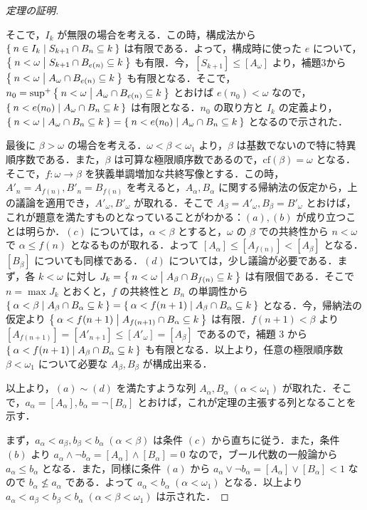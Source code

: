 \documentclass[a4j]{jsarticle}
\newcommand{\cf}{\mathrm{cf}}
\begin{document}
\begin{proof}[定理の証明]
\begin{enumerate}[(a)]
	そこで，$I_k$ が無限の場合を考える．この時，構成法から $\Set{n \in I_k | S_{k+1} \cap B_n \subseteq k}$ は有限である．よって，構成時に使った $e$ について，$\Set{n < \omega | S_{k+1} \cap B_{e(n)} \subseteq k}$ も有限．今，$[S_{k+1}] \leq [A_\omega]$ より，補題3から $\Set{n < \omega | A_\omega \cap B_{e(n)} \subseteq k}$ も有限となる．そこで，$n_0 = \sup^+ \Set{n < \omega | A_\omega \cap B_{e(n)} \subseteq k}$ とおけば $e(n_0) < \omega$ なので，$\Set{ n < e(n_0) | A_\omega \cap B_n \subseteq k}$ は有限となる．$n_0$ の取り方と $I_k$ の定義より，$\Set{n < \omega | A_\omega \cap B_n \subseteq k} = \Set{n < e(n_0) | A_\omega \cap B_n \subseteq k}$ となるので示された．
 \end{enumerate}

 最後に $\beta > \omega$ の場合を考える．$\omega < \beta < \omega_1$ より，$\beta$ は基数でないので特に特異順序数である．また，$\beta$ は可算な極限順序数であるので，$\cf(\beta) = \omega$ となる．そこで，$f: \omega \rightarrow \beta$ を狭義単調増加な共終写像とする．この時，$A'_n = A_{f(n)}, B'_n = B_{f(n)}$ を考えると，$A_\alpha, B_\alpha$ に関する帰納法の仮定から，上の議論を適用でき，$A'_\omega, B'_\omega$ が取れる．そこで $A_\beta = A'_\omega, B_\beta = B'_\omega$ とおけば，これが題意を満たすものとなっていることがわかる：$(a), (b)$ が成り立つことは明らか．$(c)$ については，$\alpha < \beta$ とすると，$\omega$ の $\beta$ での共終性から $n < \omega$ で $\alpha \leq f(n)$ となるものが取れる．よって $[A_\alpha] \leq [A_{f(n)}] < [A_\beta]$ となる．$[B_\beta]$ についても同様である．$(d)$ については，少し議論が必要である．まず，各 $k < \omega$ に対し $J_k = \Set{n < \omega | A_\beta \cap B_{f(n)} \subseteq k}$ は有限個である．そこで $n = \max J_k$ とおくと，$f$ の共終性と $B_n$ の単調性から $\Set{\alpha < \beta | A_\beta \cap B_\alpha \subseteq k} = \Set{ \alpha < f(n+1) | A_\beta \cap B_\alpha \subseteq k}$ となる．今，帰納法の仮定より $\Set{\alpha < f(n+1) | A_{f(n+1)} \cap B_\alpha \subseteq k}$ は有限．$f(n+1) < \beta$ より $[A_{f(n+1)}] = [A'_{n+1}] \leq [A'_\omega] = [A_\beta]$ であるので，補題 $3$ から $\Set{\alpha < f(n+1) | A_\beta \cap B_\alpha \subseteq k}$ も有限となる．以上より，任意の極限順序数 $\beta < \omega_1$ について必要な $A_\beta, B_\beta$ が構成出来る．

 以上より，$(a) \sim (d)$ を満たすような列 $A_\alpha, B_\alpha \; (\alpha < \omega_1)$ が取れた．そこで，$a_\alpha = [A_\alpha], b_\alpha = \neg [B_\alpha]$ とおけば，これが定理の主張する列となることを示す．

 まず，$a_\alpha < a_\beta, b_\beta < b_\alpha \; (\alpha < \beta)$ は条件 $(c)$ から直ちに従う．また，条件 $(b)$ より $a_\alpha \wedge \neg b_\alpha = [A_\alpha] \wedge [B_\alpha] = 0$ なので，ブール代数の一般論から $a_\alpha \leq b_\alpha$ となる．また，同様に条件 $(a)$ から $a_\alpha \vee \neg b_\alpha = [A_\alpha] \vee [B_\alpha] < 1$ なので $b_\alpha \not\leq a_\alpha$ である．よって $a_\alpha < b_\alpha \; (\alpha < \omega_1)$ となる．以上より $a_\alpha < a_\beta < b_\beta < b_\alpha \; (\alpha < \beta < \omega_1)$ は示された．


\end{proof}
\end{document}

